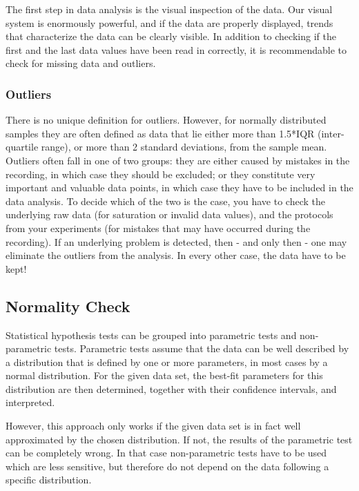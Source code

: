 The first step in data analysis is the visual inspection of the data. Our visual system is enormously powerful, and if the data are properly displayed, trends that characterize the data can be clearly visible. In addition to checking if the first and the last data values have been read in correctly, it is recommendable to check for missing data and outliers.

\subsubsection{Outliers} 

There is no unique definition for outliers. However, for normally distributed samples they are often defined as data that lie either more than 1.5*IQR (inter-quartile range), or more than 2 standard deviations, from the sample mean. Outliers often fall in one of two groups: they are either caused by mistakes in the recording, in which case they should be excluded; or they constitute very important and valuable data points, in which case they have to be included in the data analysis. To decide which of the two is the case, you have to check the underlying raw data (for saturation or invalid data values), and the protocols from your experiments (for mistakes that may have occurred during the recording). If an underlying problem is detected, then - and only then - one may eliminate the outliers from the analysis. In every other case, the data have to be kept!

\subsection{Normality Check} 

Statistical hypothesis tests can be grouped into parametric tests and non-parametric tests. Parametric tests assume that the data can be well described by a distribution that is defined by one or more parameters, in most cases by a normal distribution. For the given data set, the best-fit parameters for this distribution are then determined, together with their confidence intervals, and interpreted.

However, this approach only works if the given data set is in fact well approximated by the chosen distribution. If not, the results of the parametric test can be completely wrong. In that case non-parametric tests have to be used which are less sensitive, but therefore do not depend on the data following a specific distribution.

